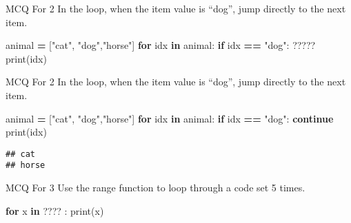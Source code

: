 \documentclass[
  8pt,
  ignorenonframetext,
]{beamer}
\newenvironment{Shaded}{\begin{snugshade}}{\end{snugshade}}
\newcommand{\BuiltInTok}[1]{#1}
\newcommand{\ControlFlowTok}[1]{\textcolor[rgb]{0.13,0.29,0.53}{\textbf{#1}}}
\newcommand{\KeywordTok}[1]{\textcolor[rgb]{0.13,0.29,0.53}{\textbf{#1}}}
\newcommand{\NormalTok}[1]{#1}
\newcommand{\OperatorTok}[1]{\textcolor[rgb]{0.81,0.36,0.00}{\textbf{#1}}}
\newcommand{\StringTok}[1]{\textcolor[rgb]{0.31,0.60,0.02}{#1}}
\begin{document}
\begin{frame}[fragile]{MCQ For 2}
\protect\hypertarget{mcq-for-2}{}
In the loop, when the item value is ``dog'', jump directly to the next
item.

\begin{Shaded}
\begin{Highlighting}[]
\NormalTok{animal }\OperatorTok{=}\NormalTok{ [}\StringTok{"cat"}\NormalTok{, }\StringTok{"dog"}\NormalTok{,}\StringTok{"horse"}\NormalTok{]}
\ControlFlowTok{for}\NormalTok{ idx }\KeywordTok{in}\NormalTok{ animal:}
  \ControlFlowTok{if}\NormalTok{ idx }\OperatorTok{==} \StringTok{"dog"}\NormalTok{:}
\NormalTok{    ?????}
  \BuiltInTok{print}\NormalTok{(idx)}
\end{Highlighting}
\end{Shaded}
\end{frame}

\begin{frame}[fragile]{MCQ For 2}
\protect\hypertarget{mcq-for-2-1}{}
In the loop, when the item value is ``dog'', jump directly to the next
item.

\begin{Shaded}
\begin{Highlighting}[]
\NormalTok{animal }\OperatorTok{=}\NormalTok{ [}\StringTok{"cat"}\NormalTok{, }\StringTok{"dog"}\NormalTok{,}\StringTok{"horse"}\NormalTok{]}
\ControlFlowTok{for}\NormalTok{ idx }\KeywordTok{in}\NormalTok{ animal:}
  \ControlFlowTok{if}\NormalTok{ idx }\OperatorTok{==} \StringTok{"dog"}\NormalTok{:}
    \ControlFlowTok{continue}
  \BuiltInTok{print}\NormalTok{(idx)}
\end{Highlighting}
\end{Shaded}

\begin{verbatim}
## cat
## horse
\end{verbatim}
\end{frame}

\begin{frame}[fragile]{MCQ For 3}
\protect\hypertarget{mcq-for-3}{}
Use the range function to loop through a code set 5 times.

\begin{Shaded}
\begin{Highlighting}[]
\ControlFlowTok{for}\NormalTok{ x }\KeywordTok{in}\NormalTok{ ???? :}
  \BuiltInTok{print}\NormalTok{(x)}
\end{Highlighting}
\end{Shaded}
\end{frame}
\end{document}
